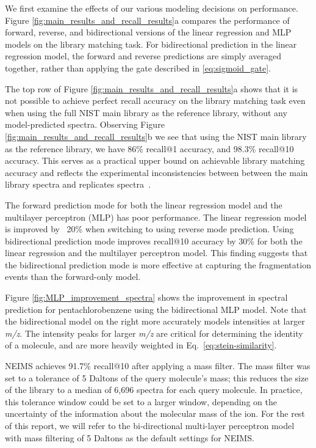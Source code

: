 \documentclass{article}
\begin{document}
We first examine the effects of our various modeling decisions on performance. Figure \ref{fig:main_results_and_recall_results}a compares the performance of forward, reverse, and bidirectional versions of the linear regression and MLP models on the library matching task. For bidirectional prediction in the linear regression model, the forward and reverse predictions are simply averaged together, rather than applying the gate described in \eqref{eq:sigmoid_gate}.

The top row of Figure \ref{fig:main_results_and_recall_results}a shows that it is not possible to achieve perfect recall accuracy on the library matching task even when using the full NIST main library as the reference library, without any model-predicted spectra. Observing Figure \ref{fig:main_results_and_recall_results}b we see that using the NIST main library as the reference library, we have 86\% recall@1 accuracy, and 98.3\% recall@10 accuracy. This serves as a practical upper bound on achievable library matching accuracy and reflects the experimental inconsistencies between between the main library spectra and replicates spectra~\cite{stein2012MassLibReview}.

The forward prediction mode for both the linear regression model and the multilayer perceptron (MLP) has poor performance. The linear regression model is improved by ~20\% when switching to using  reverse mode prediction. Using  bidirectional prediction mode improves  recall@10 accuracy by 30\% for both the linear regression and the multilayer perceptron model. This finding suggests that the bidirectional prediction mode is more effective at capturing the fragmentation events than the forward-only model.

Figure \ref{fig:MLP_improvement_spectra} shows the improvement in spectral prediction for pentachlorobenzene using the bidirectional MLP model. Note that the bidirectional model on the right more accurately models intensities at larger \textit{m/z}. The intensity peaks for larger \textit{m/z} are critical for determining the identity of a molecule, and are more heavily weighted in Eq.~\eqref{eq:stein-similarity}.

NEIMS achieves 91.7\% recall@10 after applying a mass filter. The mass filter was set to a tolerance of 5 Daltons of the query molecule's mass; this reduces the size of the library to a median of 6,696 spectra for each query molecule. In practice, this tolerance window could be set to a larger window, depending on the uncertainty of the information about the molecular mass of the ion.
For the rest of this report, we will refer to the bi-directional multi-layer perceptron model with mass filtering of 5 Daltons as the default settings for NEIMS.
\end{document}
